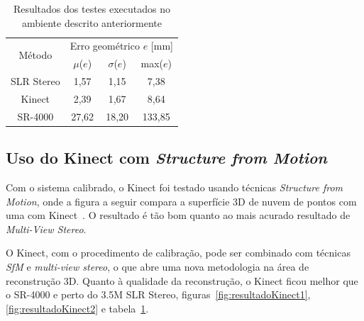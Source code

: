 \begin{table}[htbp]
\caption{Resultados dos testes executados no ambiente descrito anteriormente}
\label{tab:resultadosKinect}
\begin{center}
\begin{tabular}{|c|c|c|c|}
\hline
\multirow{2}{1.5cm}{Método}& \multicolumn{3}{p{5cm}|}{Erro geométrico $e$ [mm]} \bigstrut \\
\cline{2-4} & \multicolumn{1}{c|}{$\mu$($e$)} & \multicolumn{1}{c|}{$\sigma$($e$)} & \multicolumn{1}{c|}{max($e$)} \bigstrut \\ \hline
SLR Stereo & 1,57 & 1,15 & 7,38 \bigstrut \\ \hline
Kinect & 2,39 & 1,67 & 8,64 \bigstrut \\ \hline
SR-4000 & 27,62 & 18,20 & 133,85 \bigstrut \\ 
\hline
\end{tabular}
\end{center}
\end{table}

\subsection*{Uso do Kinect com \emph{Structure from Motion}}

Com o sistema calibrado, o Kinect foi testado usando técnicas \emph{Structure
from Motion}, onde a figura a seguir compara a superfície 3D de nuvem de pontos
com uma com Kinect~\cite{smisek20133d}.  O resultado é tão bom quanto ao mais
acurado resultado de \emph{Multi-View Stereo}.

O Kinect, com o procedimento de calibração, pode ser combinado
com técnicas \emph{SfM} e \emph{multi-view stereo}, o que abre uma
nova metodologia na área de reconstrução 3D.
Quanto à qualidade da reconstrução, o Kinect ficou melhor que o
SR-4000 e perto do 3.5M SLR Stereo, figuras~\ref{fig:resultadoKinect1}, \ref{fig:resultadoKinect2} e tabela~\ref{tab:resultadosKinect}.

